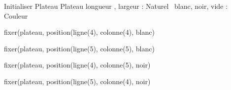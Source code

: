 \begin{algorithme}
	\small
	\fonction
	{Initialiser Plateau}
	{}
	{Plateau}
	{longueur , largeur : Naturel \
	blanc, noir, vide : Couleur}
	{
	
	fixer(plateau, position(ligne(4), colonne(4), blanc)
	
	fixer(plateau, position(ligne(5), colonne(5), blanc)

	fixer(plateau, position(ligne(4), colonne(5), noir)

	fixer(plateau, position(ligne(5), colonne(4), noir)
	}
\end{algorithme}
